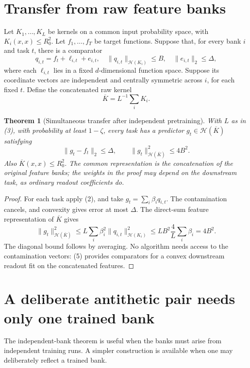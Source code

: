 \documentclass[11pt]{article}
\newtheorem{theorem}{Theorem}\newtheorem{lemma}[theorem]{Lemma}
\begin{document}
\section{Transfer from raw feature banks}
Let $K_1,\ldots,K_L$ be kernels on a common input probability space, with
$K_i(x,x)\le R_0^2$. Let $f_1,\ldots,f_T$ be target functions. Suppose
that, for every bank $i$ and task $t$, there is a comparator
\[
 q_{i,t}=f_t+\ell_{i,t}+e_{i,t},\quad
 \|q_{i,t}\|_{\mathcal H(K_i)}\le B,\quad
 \|e_{i,t}\|_2\le\Delta,                               \tag{4}
\]
where each $\ell_{i,t}$ lies in a fixed $d$-dimensional function space.
Suppose its coordinate vectors are independent and centrally symmetric
across $i$, for each fixed $t$. Define the concatenated raw kernel
\[
                         \overline K=L^{-1}\sum_iK_i.
\]

\begin{theorem}[Simultaneous transfer after independent pretraining]
With $L$ as in (3), with probability at least $1-\zeta$, every task has
a predictor $g_t\in\mathcal H(\overline K)$ satisfying
\[
             \|g_t-f_t\|_2\le\Delta,\qquad
             \|g_t\|_{\mathcal H(\overline K)}^2\le4B^2.
 \tag{5}
\]
Also $\overline K(x,x)\le R_0^2$. The common representation is the
concatenation of the original feature banks; the weights in the proof
may depend on the downstream task, as ordinary readout coefficients do.
\end{theorem}
\begin{proof}
For each task apply (2), and take $g_t=\sum_i\beta_iq_{i,t}$.
The contamination cancels, and convexity gives error at most $\Delta$.
The direct-sum feature representation of $\overline K$ gives
\[
 \|g_t\|_{\mathcal H(\overline K)}^2
 \le L\sum_i\beta_i^2\|q_{i,t}\|_{\mathcal H(K_i)}^2
 \le LB^2\frac4L\sum_i\beta_i=4B^2.
\]
The diagonal bound follows by averaging. No algorithm needs access to
the contamination vectors: (5) provides comparators for a convex
downstream readout fit on the concatenated features.
\end{proof}

\section{A deliberate antithetic pair needs only one trained bank}
The independent-bank theorem is useful when the banks must arise from
independent training runs. A simpler construction is available when one
may deliberately reflect a trained bank.
\end{document}
